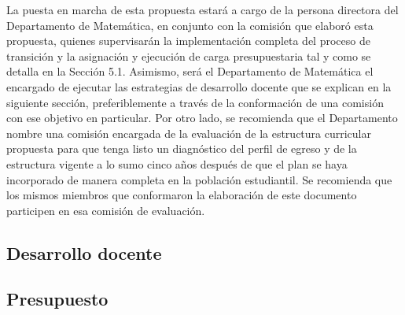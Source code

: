 La puesta en marcha de esta propuesta estará a cargo de la persona directora del Departamento de Matemática, en conjunto con la comisión que elaboró esta propuesta, quienes supervisarán la implementación completa del proceso de transición y la asignación y ejecución de carga presupuestaria tal y como se detalla en la Sección 5.1. Asimismo, será el Departamento de Matemática el encargado de ejecutar las estrategias de desarrollo docente que se explican en la siguiente sección, preferiblemente a través de la conformación de una comisión con ese objetivo en particular. 
Por otro lado, se recomienda que el Departamento nombre una comisión encargada de la evaluación de la estructura curricular propuesta para que tenga listo un diagnóstico del perfil de egreso y de la estructura vigente a lo sumo cinco años después de que el plan se haya incorporado de manera completa en la población estudiantil. Se recomienda que los mismos miembros que conformaron la elaboración de este documento participen en esa comisión de evaluación.

\subsection{Desarrollo docente}

\subsection{Presupuesto}
